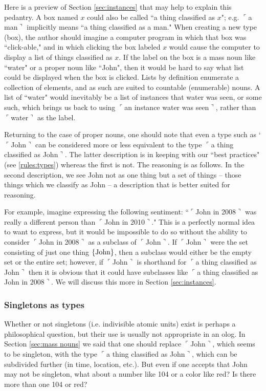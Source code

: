 \documentclass{amsart}
\newcommand{\fakebox}[1]{\tn{$\ulcorner$#1$\urcorner$}}
\theoremstyle{remark}
\theoremstyle{definition}
\def\tn{\textnormal}
\begin{document}
{Here is a preview of Section \ref{sec:instances} that may help to explain this pedantry. A box named $x$ could also be called ``a thing classified as $x$"; e.g. \fakebox{a man} implicitly means ``a thing classified as a man."  When creating a new type (box), the author should imagine a computer program in which that box was ``click-able," and in which clicking the box labeled $x$ would cause the computer to display a list of things classified as $x$. If the label on the box is a mass noun like ``water" or a proper noun like ``John", then it would be hard to say what list could be displayed when the box is clicked. Lists by definition enumerate a collection of elements, and as such are suited to countable (enumerable) nouns. A list of ``water" would inevitably be a list of instances that water was seen, or some such, which brings us back to using \fakebox{an instance water was seen}, rather than \fakebox{water} as the label.

Returning to the case of proper nouns, one should note that even a type such as `\fakebox{John} can be considered more or less equivalent to the type \fakebox{a thing classified as John}. The latter description is in keeping with our ``best practices" (see \ref{rules:types}) whereas the first is not.  The reasoning is as follows. In the second description, we see John not as one thing but a set of things -- those things which we classify as John -- a description that is better suited for reasoning. 

For example, imagine expressing the following sentiment: ``\fakebox{John in 2008} was really a different person than \fakebox{John in 2010}."  This is a perfectly normal idea to want to express, but it would be impossible to do so without the ability to consider \fakebox{John in 2008} as a subclass of \fakebox{John}. If \fakebox{John} were the set consisting of just one thing $\{\tn{John}\}$, then a subclass would either be the empty set or the entire set; however, if \fakebox{John} is shorthand for \fakebox{a thing classified as John} then it is obvious that it could have subclasses like \fakebox{a thing classified as John in 2008}. We will discuss this more in Section \ref{sec:instances}.

\subsubsection{Singletons as types}

Whether or not singletons (i.e. indivisible atomic units) exist is perhaps a philosophical question, but their use is usually not appropriate in an olog. In Section \ref{sec:mass nouns} we said that one should replace \fakebox{John}, which seems to be singleton, with the type \fakebox{a thing classified as John}, which can be subdivided further (in time, location, etc.). But even if one accepts that John may not be singleton, what about a number like 104 or a color like red?  Is there more than one 104 or red?

}
\end{document}
